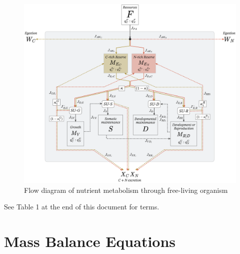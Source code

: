 \documentclass[
]{article}
\begin{document}
\begin{figure}
\centering
\includegraphics{woodstoich_appendixA_diagram.png}
\caption{Flow diagram of nutrient metabolism through free-living
organism}
\end{figure}

See Table 1 at the end of this document for terms.

\newpage

\section{Mass Balance Equations}\label{mass-balance-equations}
\end{document}

